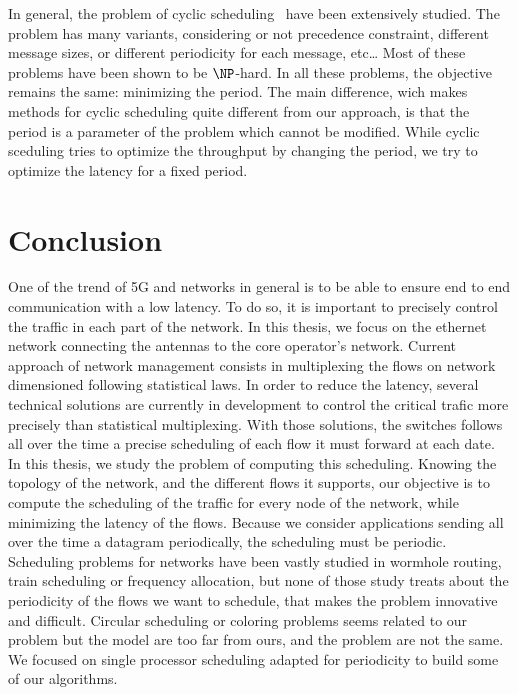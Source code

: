 In general, the problem of cyclic scheduling~\cite{levner2010complexity,hanen1993cyclic} have been extensively studied. The problem has many variants, considering or not precedence constraint, different message sizes, or different periodicity for each message, etc\dots
 Most of these problems have been shown to be $\NP$-hard. In all these problems, the objective remains the same: minimizing the period. The main difference, wich makes methods for  cyclic scheduling quite different from our approach, is that the period is a parameter of the problem
 which cannot be modified. While cyclic sceduling tries to optimize the throughput by changing the period, we try to optimize the latency for a fixed period.




\section{Conclusion}
One of the trend of 5G and networks in general is to be able to ensure end to end communication with a low latency. To do so, it is important to precisely control the traffic in each part of the network. In this thesis, we focus on the ethernet network connecting the antennas to the core operator's network. Current approach of network management consists in multiplexing the flows on network dimensioned following statistical laws. In order to reduce the latency, several technical solutions are currently in development to control the critical trafic more precisely than statistical multiplexing. With those solutions, the switches follows all over the time a precise scheduling of each flow it must forward at each date. 
In this thesis, we study the problem of computing this scheduling. Knowing the topology of the network, and the different flows it supports, our objective is to compute the scheduling of the traffic for every node of the network, while minimizing the latency of the flows. Because we consider applications sending all over the time a datagram periodically, the scheduling must be periodic.
Scheduling problems for networks have been vastly studied in wormhole routing, train scheduling or frequency allocation, but none of those study treats about the periodicity of the flows we want to schedule, that makes the problem innovative and difficult.
Circular scheduling or coloring problems seems related to our problem but the model are too far from ours, and the problem are not the same. We focused on single processor scheduling adapted for periodicity to build some of our algorithms.


